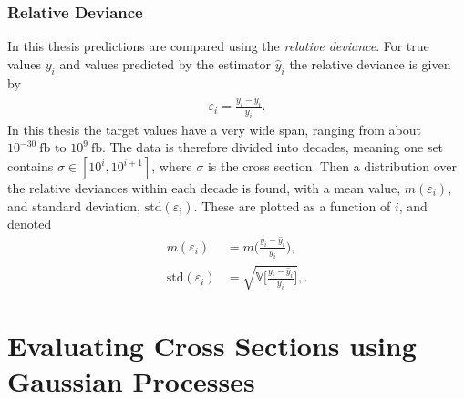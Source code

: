 \documentclass[twoside,english]{uiofysmaster}
\makeatletter
\newenvironment{chapquote}[2][2em]
  {\setlength{\@tempdima}{#1}%
   \def\chapquote@author{#2}%
   \parshape 1 \@tempdima \dimexpr\textwidth-2\@tempdima\relax%
   \itshape}
  {\par\normalfont\hfill--\ \chapquote@author\hspace*{\@tempdima}\par\bigskip}
\makeatother
\begin{document}
{{\subsection{Relative Deviance}\label{Sec:: gaussian process : Relative Deviance}

In this thesis predictions are compared using the \textit{relative deviance}. For true values $y_i$ and values predicted by the estimator $\hat{y}_i$ the relative deviance is given by
\begin{align}\label{Eq:: gaussian process : Relative deviance}
\varepsilon_i = \frac{y_i - \hat{y}_i}{y_i}.
\end{align} 
In this thesis the target values have a very wide span, ranging from about $10^{-30}~\mathrm{fb}$ to $10^9~\mathrm{fb}$. The data is therefore divided into decades, meaning one set contains $\sigma \in [10^i, 10^{i+1}]$, where $\sigma$ is the cross section. Then a distribution over the relative deviances within each decade is found, with a mean value, $m(\varepsilon_i)$, and standard deviation, $\mathrm{std}(\varepsilon_i)$. These are plotted as a function of $i$, and denoted
\begin{align}
m(\varepsilon_i) &= m \Big(\frac{y_i - \hat{y}_i}{y_i}\Big),\label{Eq:: gaussian process : rel deviance mean} \\
\mathrm{std} (\varepsilon_i) &= \sqrt{ \mathbb{V} \Big[\frac{y_i - \hat{y}_i}{y_i}\Big] },\label{Eq:: gaussian process : rel deviance variance}.
\end{align} 







\chapter{Evaluating Cross Sections using Gaussian Processes}\label{Chapter:Evaluating Cross Sections using Gaussian Processes}



}}
\end{document}
